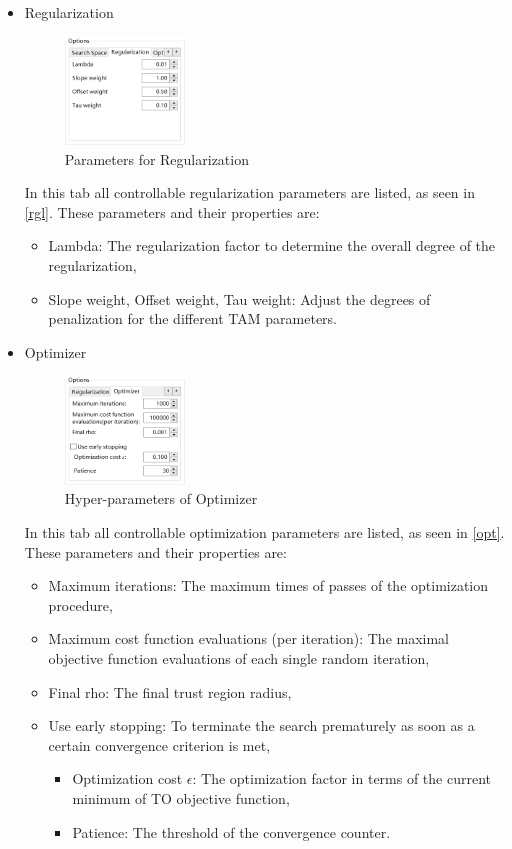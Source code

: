 \begin{itemize}
	\item Regularization
	\begin{figure}[H]
	\centering
	\includegraphics[width=0.3\textwidth]{images/regularization.png}
	\caption{Parameters for Regularization}
	\label{rgl}
	\end{figure}
	In this tab all controllable regularization parameters are listed, as seen in \autoref{rgl}. These parameters and their properties are:
	\begin{itemize}
		\item Lambda: The regularization factor to determine the overall degree of the regularization,
		\item Slope weight, Offset weight, Tau weight: Adjust the degrees of penalization for the different TAM parameters.
	\end{itemize}
	
	\item Optimizer
	\begin{figure}[H]
	\centering
	\includegraphics[width=0.3\textwidth]{images/optimizer.png}
	\caption{Hyper-parameters of Optimizer}
	\label{opt}
	\end{figure}
	In this tab all controllable optimization parameters are listed, as seen in \autoref{opt}. These parameters and their properties are:
	
	\begin{itemize}
		\item Maximum iterations: The maximum times of passes of the optimization procedure,
		\item Maximum cost function evaluations (per iteration): The maximal objective function evaluations of each single random iteration,
		\item Final rho: The final trust region radius,
		\item Use early stopping: To terminate the search prematurely as soon as a certain convergence criterion is met,
		\begin{itemize}
			\item Optimization cost $\epsilon$: The optimization factor in terms of the current minimum of TO objective function,
			\item Patience: The threshold of the convergence counter.
		\end{itemize}
	\end{itemize}
\end{itemize}

